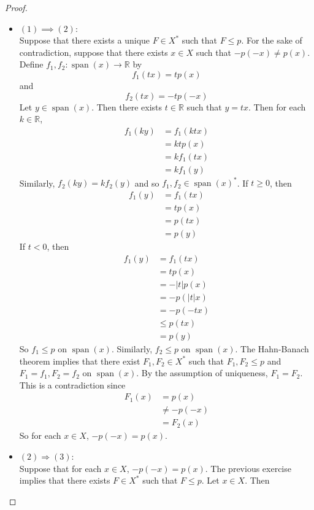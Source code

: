 \documentclass[12pt]{amsart}
\theoremstyle{definition}
\newcommand{\R}{\mathbb{R}}
\DeclareMathOperator{\spn}{span}
\DeclareMathOperator*{\0}{\mbf{0}}
\DeclareMathOperator*{\1}{\mbf{1}}
\begin{document}
	\begin{proof} \
		\begin{itemize}
			\item $(1) \implies (2)$: \\ 
			Suppose that there exists a unique $F \in X^*$ such that $F \leq p$. For the sake of contradiction, suppose that there exists $x \in X$ such that $-p(-x) \neq p(x)$. Define $f_1,f_2: \spn(x) \rightarrow \R$ by $$f_1(tx) = t p(x)$$ and $$f_2(tx) = -tp(-x)$$ Let $y \in \spn(x)$. Then there exists $t \in \R$ such that $y = tx$. Then for each $k \in \R$,
			\begin{align*}
				f_1(ky)
				&= f_1(ktx) \\
				&= ktp(x) \\
				&= k f_1(tx) \\
				&= k f_1(y)
			\end{align*}
			Similarly, $f_2(ky) = kf_2(y)$ and so $f_1, f_2 \in \spn(x)^*$. 
			If $t \geq 0$, then 
			\begin{align*}
				f_1(y) 
				&= f_1(tx) \\
				&= tp(x) \\
				&= p(tx) \\
				&= p(y) 
			\end{align*}
			If $t <0$, then 	
			\begin{align*}
				f_1(y) 
				&= f_1(tx) \\
				&= tp(x) \\
				&= -|t|p(x) \\
				&= -p(|t|x) \\
				&= -p(-tx) \\
				& \leq p(tx) \\
				&= p(y)  
			\end{align*}
			So $f_1 \leq p$ on $\spn(x)$. Similarly, $f_2 \leq p$ on $\spn(x)$. The Hahn-Banach theorem implies that there exist $F_1, F_2 \in X^*$ such that $F_1, F_2 \leq p$ and $F_1 = f_1, F_2 = f_2$ on $\spn(x)$. By the assumption of uniqueness, $F_1 = F_2$. This is a contradiction since 
			\begin{align*}
				F_1(x) 
				&= p(x) \\
				& \neq -p(-x) \\
				& = F_2(x) 
			\end{align*}		
			So for each $x \in X$, $-p(-x) = p(x)$. 
			\item $(2) \Rightarrow (3)$: \\
			Suppose that for each $x \in X$, $-p(-x) = p(x)$. The previous exercise implies that there exists $F \in X^*$ such that $F \leq p$. Let $x \in X$. Then 

\end{itemize}
\end{proof}
\end{document}
